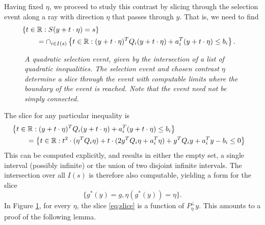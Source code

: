 \documentclass{imsart}
\begin{document}
Having fixed $\eta$, we proceed to study this contrast by slicing through the selection event along a ray with direction $\eta$ that passes through $y$. 
That is, we need to find
$$
\begin{aligned}
\lefteqn{
\left\{t \in \mathbb R : S(y+t \cdot \eta)=s \right\} } \\
 & \qquad = \cap_{i \in I(s)} \left\{t \in \mathbb R : (y+t \cdot \eta)^T Q_i (y+t \cdot \eta) + a_i^T(y+t \cdot \eta) \leq b_i\right\}. \\
\end{aligned}
$$
\begin{figure}[!htp]
\begin{center}
\resizebox{!}{3in}{}
\end{center}
\caption{ \em
A quadratic selection event, given by the intersection of a list
of quadratic inequalities. The selection event and chosen contrast
$\eta$ determine a slice through the event with computable limits
where the boundary of the event is reached.
Note that the event need not be simply connected.
}
\label{fig:curved}
\end{figure}
The slice for any particular inequality is
\begin{equation}
\begin{aligned}
\label{eq:quadslice}
\lefteqn{
\left\{t \in \mathbb R : (y+t\cdot \eta)^T Q_i (y+t \cdot \eta) + a_i^T(y+t \cdot \eta) \leq b_i\right\}} \\
 & \qquad = \left\{t \in \mathbb R : t^2 \cdot (\eta^TQ_i\eta) + t \cdot(2 y^TQ_i\eta + a_i^T\eta) + y^TQ_iy + a_i^Ty - b_i \leq 0 \right\} \\
\end{aligned}
\end{equation}
This can be computed explicitly, and results in either the empty set, a single interval (possibly infinite) or the union of 
two disjoint infinite intervals. The intersection over all $I(s)$ is therefore also computable, yielding a form for the slice
\begin{equation}
\label{eq:slice}
\{g^*(y)=g, \eta(g^*(y))=\eta\}.
\end{equation}
In Figure \ref{fig:curved}, for every $\eta$, the slice \eqref{eq:slice} is a function
of $P_{\eta}^{\perp}y$. This amounts to a proof of the following lemma.
\end{document}
